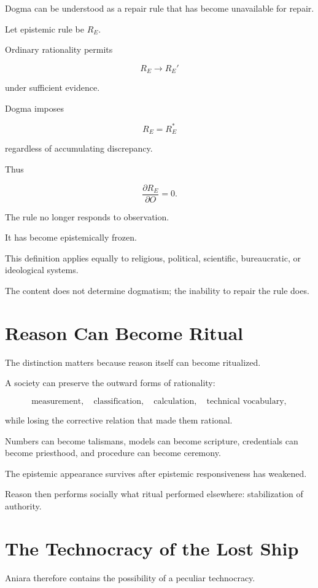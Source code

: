 \documentclass[11pt,oneside]{book}
\theoremstyle{definition}
\theoremstyle{remark}
\begin{document}
Dogma can be understood as a repair rule that has become unavailable for repair.

Let epistemic rule be \(R_E\).

Ordinary rationality permits

\[
R_E\rightarrow R_E'
\]

under sufficient evidence.

Dogma imposes

\[
R_E=R_E^\ast
\]

regardless of accumulating discrepancy.

Thus

\[
\frac{\partial R_E}{\partial O}=0.
\]

The rule no longer responds to observation.

It has become epistemically frozen.

This definition applies equally to religious, political, scientific, bureaucratic, or ideological systems.

The content does not determine dogmatism; the inability to repair the rule does.

\section{Reason Can Become Ritual}

The distinction matters because reason itself can become ritualized.

A society can preserve the outward forms of rationality:

\[
\text{measurement},
\quad
\text{classification},
\quad
\text{calculation},
\quad
\text{technical vocabulary},
\]

while losing the corrective relation that made them rational.

Numbers can become talismans, models can become scripture, credentials can become priesthood, and procedure can become ceremony.

The epistemic appearance survives after epistemic responsiveness has weakened.

Reason then performs socially what ritual performed elsewhere: stabilization of authority.

\section{The Technocracy of the Lost Ship}

Aniara therefore contains the possibility of a peculiar technocracy.
\end{document}

